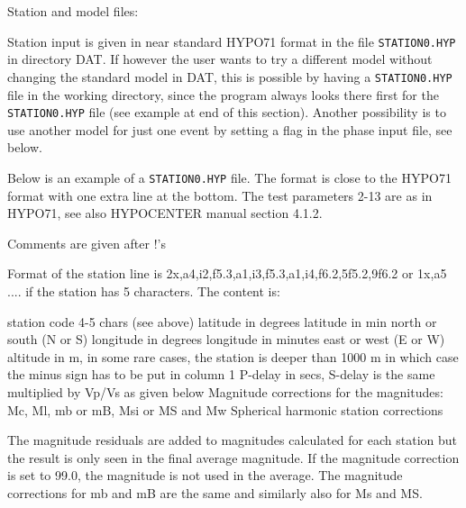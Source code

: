 Station and model files: 

Station input is given in near standard HYPO71 format in the file \texttt{STATION0.HYP} in directory DAT. If however the user wants to try a different model without changing the standard model in DAT, this is possible by having a \texttt{STATION0.HYP} file in the working directory, since the program always looks there first for the \texttt{STATION0.HYP} file (see example at end of this section). Another possibility is to use another model for just one event by setting a flag in the phase input file, see below. 

Below is an example of a \texttt{STATION0.HYP} file. The format is close to the  HYPO71 format with one extra line at the bottom. The test parameters 2-13 are as in HYPO71, see also HYPOCENTER manual section 
4.1.2. 

Comments are given after !'s 




Format of the station line is 2x,a4,i2,f5.3,a1,i3,f5.3,a1,i4,f6.2,5f5.2,9f6.2 
or 1x,a5 .... if the station has 5 characters. The content is: 

\noindent
station code 4-5 chars (see above) \newline
latitude in degrees \newline
latitude in min \newline
north or south (N or S) \newline
longitude in degrees \newline
longitude in minutes \newline
east or west (E or W) \newline
altitude in m, in some rare cases, the station is deeper than 1000 m in which case the minus sign has to be put in column 1 \newline
P-delay in secs, S-delay is the same multiplied by Vp/Vs as given below \newline
Magnitude corrections for the magnitudes: Mc, Ml, mb or mB, Msi or MS and Mw \newline
Spherical harmonic station corrections

The magnitude residuals are added to magnitudes calculated for each station but the result is only seen in the final average magnitude. If the magnitude correction is set to 99.0, the magnitude is not used in the average.
The magnitude corrections for  mb and mB are the same and similarly also for Ms and MS.

